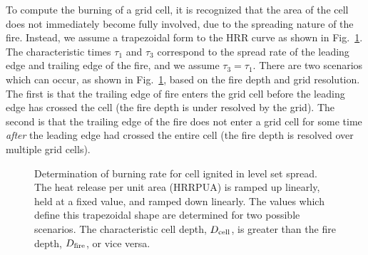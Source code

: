 To compute the burning of a grid cell, it is recognized that the area of the cell does not immediately become fully involved, due to the spreading nature of the fire. Instead, we assume a trapezoidal form to the HRR curve as shown in Fig.~\ref{fig:LS_burning_rate}. The characteristic times $\tau_1$ and $\tau_3$ correspond to the spread rate of the leading edge and trailing edge of the fire, and we assume $\tau_3 = \tau_1$. There are two scenarios which can occur, as shown in Fig.~\ref{fig:LS_burning_rate}, based on the fire depth and grid resolution. The first is that the trailing edge of fire enters the grid cell before the leading edge has crossed the cell (the fire depth is under resolved by the grid). The second is that the trailing edge of the fire does not enter a grid cell for some time {\it after} the leading edge had crossed the entire cell (the fire depth is resolved over multiple grid cells).

\begin{figure}
    \begin{center}
        \caption[Determination of burning rate for cell ignited in level set spread]{\label{fig:LS_burning_rate} Determination of burning rate for cell ignited in level set spread. The heat release per unit area (HRRPUA) is ramped up linearly, held at a fixed value, and ramped down linearly. The values which define this trapezoidal shape are determined for two possible scenarios. The characteristic cell depth, $D_{\rm cell}$, is greater than the fire depth, $D_{\rm fire}$, or vice versa.}
    \end{center}
\end{figure}

